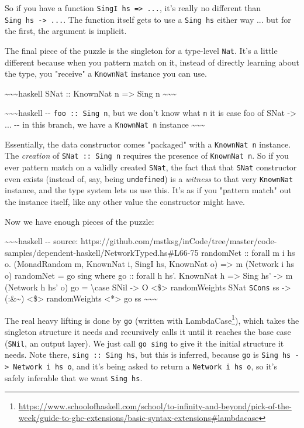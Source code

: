 \documentclass[]{article}
\renewcommand{\href}[2]{#2\footnote{\url{#1}}}
\begin{document}
So if you have a function \texttt{SingI\ hs\ =\textgreater{}\ ...}, it's really
no different than \texttt{Sing\ hs\ -\textgreater{}\ ...}. The function itself
gets to use a \texttt{Sing\ hs} either way ... but for the first, the argument
is implicit.

The final piece of the puzzle is the singleton for a type-level \texttt{Nat}.
It's a little different because when you pattern match on it, instead of
directly learning about the type, you "receive" a \texttt{KnownNat} instance you
can use.

\textasciitilde{}\textasciitilde{}\textasciitilde{}haskell SNat :: KnownNat n
=\textgreater{} Sing n \textasciitilde{}\textasciitilde{}\textasciitilde{}

\textasciitilde{}\textasciitilde{}\textasciitilde{}haskell -\/-
\texttt{foo\ ::\ Sing\ n}, but we don't know what \texttt{n} it is case foo of
SNat -\textgreater{} ... -\/- in this branch, we have a \texttt{KnownNat\ n}
instance \textasciitilde{}\textasciitilde{}\textasciitilde{}

Essentially, the data constructor comes "packaged" with a \texttt{KnownNat\ n}
instance. The \emph{creation} of \texttt{SNat\ ::\ Sing\ n} requires the
presence of \texttt{KnownNat\ n}. So if you ever pattern match on a validly
created \texttt{SNat}, the fact that that \texttt{SNat} constructor even exists
(instead of, say, being \texttt{undefined}) is a \emph{witness} to that very
\texttt{KnownNat} instance, and the type system lets us use this. It's as if you
"pattern match" out the instance itself, like any other value the constructor
might have.

Now we have enough pieces of the puzzle:

\textasciitilde{}\textasciitilde{}\textasciitilde{}haskell -\/- source:
https://github.com/mstksg/inCode/tree/master/code-samples/dependent-haskell/NetworkTyped.hs\#L66-75
randomNet :: forall m i hs o. (MonadRandom m, KnownNat i, SingI hs, KnownNat o)
=\textgreater{} m (Network i hs o) randomNet = go sing where go :: forall h hs'.
KnownNat h =\textgreater{} Sing hs' -\textgreater{} m (Network h hs' o) go =
\textbackslash{}case SNil -\textgreater{} O \textless{}\$\textgreater{}
randomWeights SNat \texttt{SCons} ss -\textgreater{} (:\&\textasciitilde{})
\textless{}\$\textgreater{} randomWeights \textless{}*\textgreater{} go ss
\textasciitilde{}\textasciitilde{}\textasciitilde{}

The real heavy lifting is done by \texttt{go} (written with
\href{https://www.schoolofhaskell.com/school/to-infinity-and-beyond/pick-of-the-week/guide-to-ghc-extensions/basic-syntax-extensions\#lambdacase}{LambdaCase}),
which takes the singleton structure it needs and recursively calls it until it
reaches the base case (\texttt{SNil}, an output layer). We just call
\texttt{go\ sing} to give it the initial structure it needs. Note there,
\texttt{sing\ ::\ Sing\ hs}, but this is inferred, because \texttt{go} is
\texttt{Sing\ hs\ -\textgreater{}\ Network\ i\ hs\ o}, and it's being asked to
return a \texttt{Network\ i\ hs\ o}, so it's safely inferable that we want
\texttt{Sing\ hs}.
\end{document}
